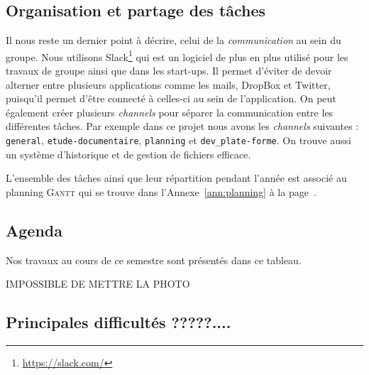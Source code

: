 \subsection{Organisation et partage des tâches}
Il nous reste un dernier point à décrire, celui de la \emph{communication}
au sein du groupe.
Nous utilisons Slack\footnote{\url{https://slack.com/}} qui est un logiciel
de plus en plus utilisé pour les travaux de groupe ainsi que dans les start-ups.
Il permet d'éviter de devoir alterner entre plusieurs applications comme les mails,
DropBox et Twitter, puisqu'il permet d'être connecté
à celles-ci au sein de l'application.
On peut également créer plusieurs \emph{channels} pour séparer la communication
entre les différentes tâches.
Par exemple dans ce projet nous avons les \emph{channels} suivantes :
\texttt{general}, \texttt{etude-documentaire}, 
\texttt{planning} et \texttt{dev\_plate-forme}.
On trouve aussi un système d'historique et de gestion de fichiers efficace.

L'ensemble des tâches ainsi que leur répartition pendant l'année
est associé au planning \textsc{Gantt} qui se trouve
dans l'Annexe~\ref{ann:planning} à la page~\pageref{ann:planning}.

\subsection{Agenda}

Nos travaux au cours de ce semestre sont présentés dans ce tableau.

IMPOSSIBLE DE METTRE LA PHOTO


\subsection{Principales difficultés ?????....}